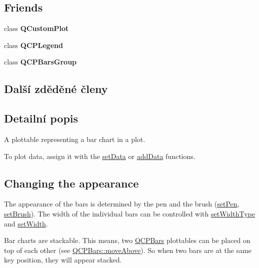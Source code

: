 \subsection*{Friends}
\begin{DoxyCompactItemize}
\item 
\hypertarget{classQCPBars_a1cdf9df76adcfae45261690aa0ca2198}{}class {\bfseries Q\+Custom\+Plot}\label{classQCPBars_a1cdf9df76adcfae45261690aa0ca2198}

\item 
\hypertarget{classQCPBars_a8429035e7adfbd7f05805a6530ad5e3b}{}class {\bfseries Q\+C\+P\+Legend}\label{classQCPBars_a8429035e7adfbd7f05805a6530ad5e3b}

\item 
\hypertarget{classQCPBars_ae1051b4d58a2786cb420367a586e2fee}{}class {\bfseries Q\+C\+P\+Bars\+Group}\label{classQCPBars_ae1051b4d58a2786cb420367a586e2fee}

\end{DoxyCompactItemize}
\subsection*{Další zděděné členy}


\subsection{Detailní popis}
A plottable representing a bar chart in a plot. 



To plot data, assign it with the \hyperlink{classQCPBars_aa3435aab19e0a49e4e7b41bd36a8d96b}{set\+Data} or \hyperlink{classQCPBars_a1f29cf08615040993209147fa68de3f2}{add\+Data} functions.\hypertarget{classQCPStatisticalBox_appearance}{}\subsection{Changing the appearance}\label{classQCPStatisticalBox_appearance}
The appearance of the bars is determined by the pen and the brush (\hyperlink{classQCPAbstractPlottable_ab74b09ae4c0e7e13142fe4b5bf46cac7}{set\+Pen}, \hyperlink{classQCPAbstractPlottable_a7a4b92144dca6453a1f0f210e27edc74}{set\+Brush}). The width of the individual bars can be controlled with \hyperlink{classQCPBars_adcaa3b41281bb2c0f7949b341592fcc0}{set\+Width\+Type} and \hyperlink{classQCPBars_afec6116579d44d5b706e0fa5e5332507}{set\+Width}.

Bar charts are stackable. This means, two \hyperlink{classQCPBars}{Q\+C\+P\+Bars} plottables can be placed on top of each other (see \hyperlink{classQCPBars_ac22e00a6a41509538c21b04f0a57318c}{Q\+C\+P\+Bars\+::move\+Above}). So when two bars are at the same key position, they will appear stacked.

